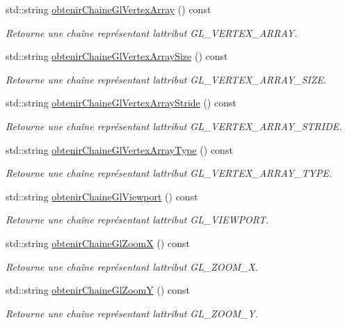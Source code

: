 \begin{DoxyCompactItemize}
std\+::string \hyperlink{group__utilitaire_gaaa758212d7a3f274415edbc9e2532289}{obtenir\+Chaine\+Gl\+Vertex\+Array} () const 
\begin{DoxyCompactList}\small\item\em Retourne une chaîne représentant l\textquotesingle{}attribut G\+L\+\_\+\+V\+E\+R\+T\+E\+X\+\_\+\+A\+R\+R\+A\+Y. \end{DoxyCompactList}\item 
std\+::string \hyperlink{group__utilitaire_ga5475c8155f182e7c018cca2f6124f746}{obtenir\+Chaine\+Gl\+Vertex\+Array\+Size} () const 
\begin{DoxyCompactList}\small\item\em Retourne une chaîne représentant l\textquotesingle{}attribut G\+L\+\_\+\+V\+E\+R\+T\+E\+X\+\_\+\+A\+R\+R\+A\+Y\+\_\+\+S\+I\+Z\+E. \end{DoxyCompactList}\item 
std\+::string \hyperlink{group__utilitaire_ga7830e4ba0be698e54d824a5c6a430f5d}{obtenir\+Chaine\+Gl\+Vertex\+Array\+Stride} () const 
\begin{DoxyCompactList}\small\item\em Retourne une chaîne représentant l\textquotesingle{}attribut G\+L\+\_\+\+V\+E\+R\+T\+E\+X\+\_\+\+A\+R\+R\+A\+Y\+\_\+\+S\+T\+R\+I\+D\+E. \end{DoxyCompactList}\item 
std\+::string \hyperlink{group__utilitaire_ga27df79ce6a4279f818c5cd041e8dc6bd}{obtenir\+Chaine\+Gl\+Vertex\+Array\+Type} () const 
\begin{DoxyCompactList}\small\item\em Retourne une chaîne représentant l\textquotesingle{}attribut G\+L\+\_\+\+V\+E\+R\+T\+E\+X\+\_\+\+A\+R\+R\+A\+Y\+\_\+\+T\+Y\+P\+E. \end{DoxyCompactList}\item 
std\+::string \hyperlink{group__utilitaire_ga6afc9840c8a03deb6d741843bf82d28d}{obtenir\+Chaine\+Gl\+Viewport} () const 
\begin{DoxyCompactList}\small\item\em Retourne une chaîne représentant l\textquotesingle{}attribut G\+L\+\_\+\+V\+I\+E\+W\+P\+O\+R\+T. \end{DoxyCompactList}\item 
std\+::string \hyperlink{group__utilitaire_ga8ca35baf35a77d201c5a770a22aedbe8}{obtenir\+Chaine\+Gl\+Zoom\+X} () const 
\begin{DoxyCompactList}\small\item\em Retourne une chaîne représentant l\textquotesingle{}attribut G\+L\+\_\+\+Z\+O\+O\+M\+\_\+\+X. \end{DoxyCompactList}\item 
std\+::string \hyperlink{group__utilitaire_ga4231723bc8a26f191c53329dceed9222}{obtenir\+Chaine\+Gl\+Zoom\+Y} () const 
\begin{DoxyCompactList}\small\item\em Retourne une chaîne représentant l\textquotesingle{}attribut G\+L\+\_\+\+Z\+O\+O\+M\+\_\+\+Y. \end{DoxyCompactList}\end{DoxyCompactItemize}
